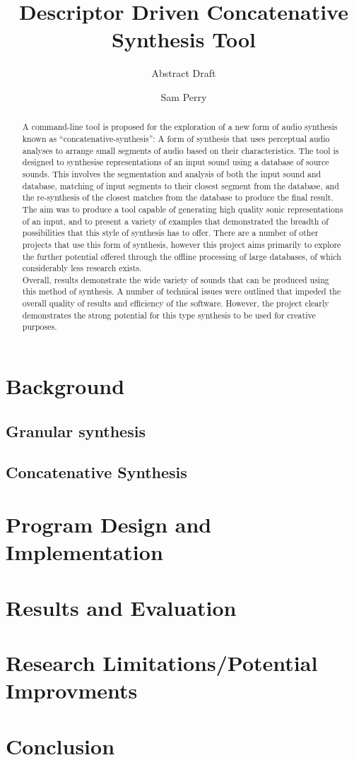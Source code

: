 \documentclass{scrartcl}
\begin{document}
    \title{Descriptor Driven Concatenative Synthesis Tool}
    \subtitle{\LARGE{Abstract Draft}}
    \author{Sam Perry}
    \date{}

    \maketitle


    \begin{abstract} 
    A command-line tool is proposed for the exploration of a new form of audio
    synthesis known as ``concatenative-synthesis'': A form of synthesis that uses
    perceptual audio analyses to arrange small segments of audio based on their
    characteristics.  The tool is designed to synthesise representations of an
    input sound using a database of source sounds. This involves the
    segmentation and analysis of both the input sound and database, matching of
    input segments to their closest segment from the database, and the
    re-synthesis of the closest matches from the database to produce the final
    result.\\

    The aim was to produce a tool capable of generating high quality sonic
    representations of an input, and to present a variety of examples that
    demonstrated the breadth of possibilities that this style of synthesis has
    to offer. There are a number of other projects that use this form of
    synthesis, however this project aims primarily to explore the further
    potential offered through the offline processing of large databases, of
    which considerably less research exists.\\

    Overall, results demonstrate the wide variety of sounds that can be
    produced using this method of synthesis. A number of technical issues were
    outlined that impeded the overall quality of results and efficiency of the
    software. However, the project clearly demonstrates the strong potential
    for this type synthesis to be used for creative purposes.
    \end{abstract}

    \section*{Background}
    \subsection*{Granular synthesis}
    \subsection*{Concatenative Synthesis}
    \section*{Program Design and Implementation}
    \section*{Results and Evaluation}
    \section*{Research Limitations/Potential Improvments}
    \section*{Conclusion}
\end{document}
